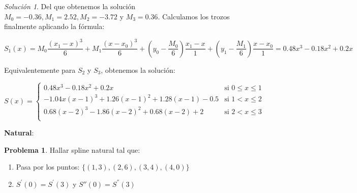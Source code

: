 \documentclass[11pt,spanish,]{article}
\theoremstyle{definition} \newtheorem*{definicion}{Definición}
\newtheorem*{problema}{Problema} \theoremstyle{remark}
\newtheorem*{solucion}{Solución}
\begin{document}
\begin{solucion}
Del que obtenemos la solución $M_0=-0.36, M_1=2.52, M_2=-3.72 \text{ y } M_3=0.36$.
Calculamos los trozos finalmente aplicando la fórmula:

$$S_1(x)= M_0\frac{(x_1-x)^3}{6} + M_1\frac{(x-x_0)^3}{6} + (y_0-\frac{M_0}{6})\frac{x_1-x}{1} + (y_1-\frac{M_1}{6})\frac{x-x_0}{1} = 0.48x^3 - 0.18x^2 + 0.2x$$

Equivalentemente para $S_2$ y $S_3$, obtenemos la solución:

\begin{equation*}
 S(x) =
  \begin{cases}
   0.48x^3 - 0.18x^2 + 0.2x &                              \text{si } 0 \leq x \leq 1  \\
   -1.04x(x-1)^3 + 1.26(x-1)^2 + 1.28(x-1) - 0.5   &  \text{si } 1 < x \leq 2  \\
   0.68(x-2)^3 - 1.86(x-2)^2 + 0.68(x-2) + 2       &  \text{si } 2 < x \leq 3  \\
  \end{cases}
\end{equation*}
\end{solucion}

\textbf{Natural}:

\begin{problema}
Hallar spline natural tal que:
\begin{enumerate}
\item Pasa por los puntos: $\{(1,3),(2,6),(3,4), (4,0)\}$
\item $S^{'}(0) = S^{'}(3)$ y $S{''}(0) = S^{''}(3)$
\end{enumerate}
\end{problema}

\vspace*{\baselineskip}
\end{document}
